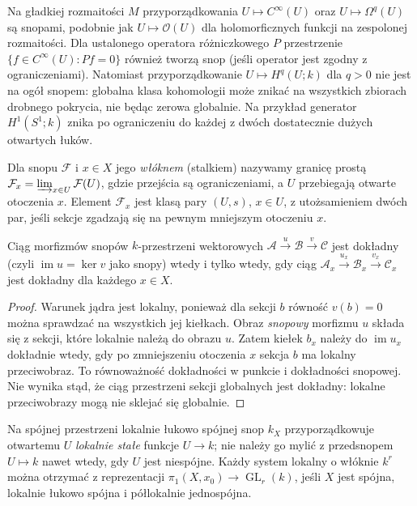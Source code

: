 \begin{przyklad}
Na gładkiej rozmaitości $M$ przyporządkowania
$U\mapsto C^\infty(U)$ oraz $U\mapsto\Omega^q(U)$ są snopami,
podobnie jak $U\mapsto\mathcal O(U)$ dla holomorficznych funkcji na
zespolonej rozmaitości. Dla ustalonego operatora różniczkowego $P$
przestrzenie $\{f\in C^\infty(U):Pf=0\}$ również tworzą snop
(jeśli operator jest zgodny z ograniczeniami).
Natomiast przyporządkowanie $U\mapsto H^q(U;k)$ dla $q>0$ nie jest
na ogół snopem: globalna klasa kohomologii może znikać na wszystkich
zbiorach drobnego pokrycia, nie będąc zerowa globalnie.
Na przykład generator $H^1(S^1;k)$ znika po ograniczeniu
do każdej z dwóch dostatecznie dużych otwartych łuków.
\end{przyklad}

\begin{definicja}
Dla snopu $\mathcal F$ i $x\in X$ jego \emph{włóknem} (stalkiem)
nazywamy granicę prostą
$\mathcal F_x=\varinjlim_{x\in U}\mathcal F(U)$, gdzie przejścia
są ograniczeniami, a $U$ przebiegają otwarte otoczenia $x$.
Element $\mathcal F_x$ jest klasą pary $(U,s)$, $x\in U$,
z utożsamieniem dwóch par, jeśli sekcje zgadzają się
na pewnym mniejszym otoczeniu $x$.
\end{definicja}

\begin{lemat}
\label{lem:stalk-exact-v12}
Ciąg morfizmów snopów $k$-przestrzeni wektorowych
$\mathcal A\xrightarrow{u}\mathcal B\xrightarrow{v}\mathcal C$
jest dokładny (czyli $\operatorname{im}u=\ker v$ jako snopy)
wtedy i tylko wtedy, gdy ciąg
$\mathcal A_x\xrightarrow{u_x}\mathcal B_x\xrightarrow{v_x}\mathcal C_x$
jest dokładny dla każdego $x\in X$.
\end{lemat}
\begin{proof}
Warunek jądra jest lokalny, ponieważ dla sekcji $b$ równość $v(b)=0$
można sprawdzać na wszystkich jej kiełkach. Obraz \emph{snopowy}
morfizmu $u$ składa się z sekcji, które lokalnie należą do obrazu $u$.
Zatem kiełek $b_x$ należy do $\operatorname{im}u_x$ dokładnie wtedy,
gdy po zmniejszeniu otoczenia $x$ sekcja $b$ ma lokalny przeciwobraz.
To równoważność dokładności w punkcie i dokładności snopowej.
Nie wynika stąd, że ciąg przestrzeni sekcji globalnych jest dokładny:
lokalne przeciwobrazy mogą nie sklejać się globalnie.
\end{proof}

\begin{przyklad}
Na spójnej przestrzeni lokalnie łukowo spójnej snop $k_X$
przyporządkowuje otwartemu $U$ \emph{lokalnie stałe} funkcje $U\to k$;
nie należy go mylić z przedsnopem $U\mapsto k$ nawet wtedy,
gdy $U$ jest niespójne. Każdy system lokalny o włóknie $k^r$
można otrzymać z reprezentacji
$\pi_1(X,x_0)\to\operatorname{GL}_r(k)$,
jeśli $X$ jest spójna, lokalnie łukowo spójna i półlokalnie jednospójna.
\end{przyklad}


